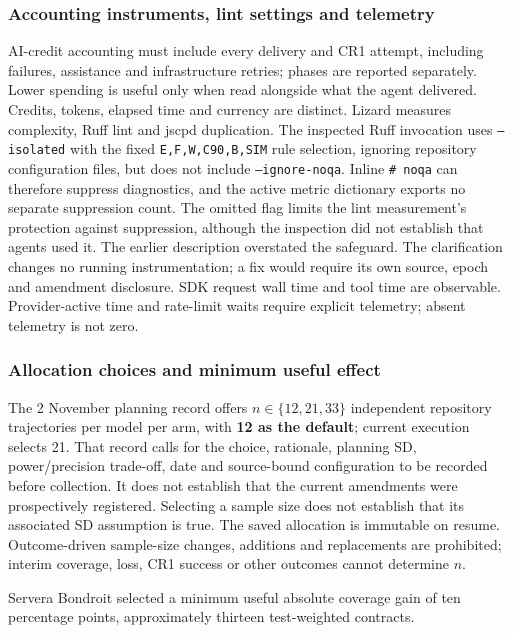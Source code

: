 \subsubsection{Accounting instruments, lint settings and telemetry}

AI-credit accounting must include every delivery and CR1 attempt, including
failures, assistance and infrastructure retries; phases are reported
separately. Lower spending is useful only when read alongside what the
agent delivered. Credits, tokens, elapsed
time and currency are distinct. Lizard measures complexity, Ruff lint
and jscpd duplication. The inspected Ruff invocation uses
\texttt{--isolated} with the fixed \texttt{E,F,W,C90,B,SIM} rule selection,
ignoring repository configuration files, but does not include
\texttt{--ignore-noqa}. Inline \texttt{\# noqa} can therefore suppress
diagnostics, and the active metric dictionary exports no separate suppression
count. The omitted flag limits the lint measurement's protection against
suppression, although the inspection did not establish that agents used it.
The earlier description overstated the safeguard. The clarification
changes no running instrumentation; a fix would require its own source,
epoch and amendment disclosure.
SDK request wall time and tool time are observable. Provider-active
time and rate-limit waits require explicit telemetry; absent telemetry
is not zero.

\subsubsection{Allocation choices and minimum useful effect}

The 2 November planning record offers $n\in\{12,21,33\}$ independent
repository trajectories per model per arm, with \textbf{12 as the default};
current execution selects 21. That record calls for the choice, rationale,
planning SD, power/precision trade-off, date and source-bound configuration
to be recorded before collection. It does not establish that the current
amendments were prospectively registered. Selecting a sample size does not
establish that its associated SD assumption is true.
The saved allocation is immutable on resume. Outcome-driven sample-size
changes, additions and replacements are prohibited; interim coverage,
loss, CR1 success or other outcomes cannot determine $n$.

Servera Bondroit selected a minimum useful absolute coverage gain of ten
percentage points, approximately thirteen test-weighted contracts.

